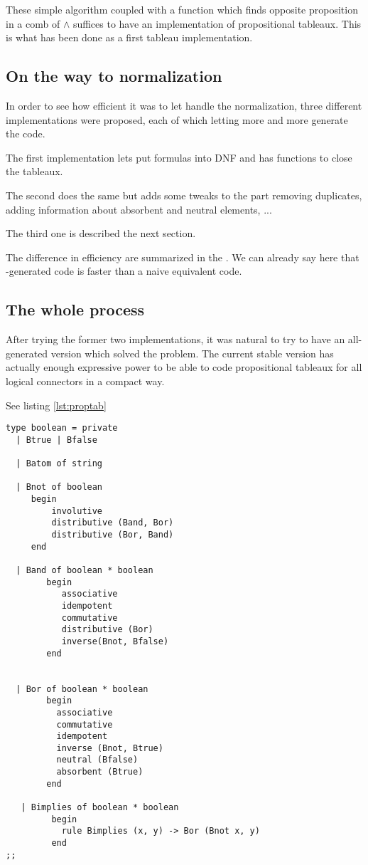 These simple algorithm coupled with a function which finds opposite
proposition in a comb of $\land$ suffices to have an implementation of
propositional tableaux. This is what has been done as a first tableau
implementation. 

\subsection{On the way to normalization}
In order to see how efficient it was to let \moca handle the
normalization, three different implementations were proposed, each of
which letting more and more \moca generate the code.

The first implementation lets \moca put formulas into DNF and has
functions to close the tableaux.

The second does the same but adds some tweaks to the \moca part
removing duplicates, adding information about absorbent and neutral
elements, ... 

The third one is described the next section.

The difference in efficiency are summarized in the
. We can already say here that \moca-generated code
is faster than a naive equivalent code.

\subsection{The whole process}

After trying the former two implementations, it was natural to try to
have an all-generated version which solved the problem. The current
stable version has actually enough expressive power to be able to
code propositional tableaux for all logical connectors in a compact way.

See listing \ref{lst:proptab}
\begin{lstlisting}[float,
  caption={Propositional tableaux},
  label={lst:whole_proptab}]
 type boolean = private
  | Btrue | Bfalse
   
  | Batom of string
 
  | Bnot of boolean
     begin 
         involutive 
         distributive (Band, Bor) 
         distributive (Bor, Band) 
     end 

  | Band of boolean * boolean
        begin
           associative 
           idempotent 
           commutative 
           distributive (Bor) 
           inverse(Bnot, Bfalse)
        end


  | Bor of boolean * boolean
        begin
          associative  
          commutative 
          idempotent
          inverse (Bnot, Btrue)
          neutral (Bfalse)
          absorbent (Btrue)
        end

   | Bimplies of boolean * boolean 
         begin 
           rule Bimplies (x, y) -> Bor (Bnot x, y) 
         end
;;

\end{lstlisting}

